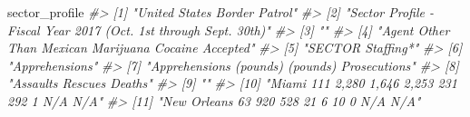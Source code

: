 \documentclass[
]{krantz}
\makeatletter
\newenvironment{Shaded}{\begin{snugshade}}{\end{snugshade}}
\newcommand{\CommentTok}[1]{\textcolor[rgb]{0.37,0.37,0.37}{\textit{#1}}}
\newcommand{\NormalTok}[1]{#1}
\newenvironment{kframe}{%
\medskip{}
\setlength{\fboxsep}{.8em}
 \def\at@end@of@kframe{}%
 \ifinner\ifhmode%
  \def\at@end@of@kframe{\end{minipage}}%
  \begin{minipage}{\columnwidth}%
 \fi\fi%
 \def\FrameCommand##1{\hskip\@totalleftmargin \hskip-\fboxsep
 \colorbox{shadecolor}{##1}\hskip-\fboxsep
     \hskip-\linewidth \hskip-\@totalleftmargin \hskip\columnwidth}%
 \MakeFramed {\advance\hsize-\width
   \@totalleftmargin\z@ \linewidth\hsize
   \@setminipage}}%
 {\par\unskip\endMakeFramed%
 \at@end@of@kframe}
\renewenvironment{Shaded}{\begin{kframe}}{\end{kframe}}
\makeatother
\begin{document}
\begin{Shaded}
\begin{Highlighting}[]
\NormalTok{sector\_profile}
\CommentTok{\#\textgreater{}  [1] "United States Border Patrol"                                                                                                                                                                               }
\CommentTok{\#\textgreater{}  [2] "Sector Profile {-} Fiscal Year 2017 (Oct. 1st through Sept. 30th)"                                                                                                                                           }
\CommentTok{\#\textgreater{}  [3] ""                                                                                                                                                                                                          }
\CommentTok{\#\textgreater{}  [4] "Agent                              Other Than Mexican            Marijuana          Cocaine         Accepted"                                                                                              }
\CommentTok{\#\textgreater{}  [5] "SECTOR                           Staffing*"                                                                                                                                                                }
\CommentTok{\#\textgreater{}  [6] "Apprehensions"                                                                                                                                                                                             }
\CommentTok{\#\textgreater{}  [7] "Apprehensions                 (pounds)          (pounds)     Prosecutions"                                                                                                                                 }
\CommentTok{\#\textgreater{}  [8] "Assaults Rescues                 Deaths"                                                                                                                                                                   }
\CommentTok{\#\textgreater{}  [9] ""                                                                                                                                                                                                          }
\CommentTok{\#\textgreater{} [10] "Miami                                             111              2,280                     1,646                  2,253              231               292              1              N/A      N/A"     }
\CommentTok{\#\textgreater{} [11] "New Orleans                                        63                920                      528                     21                 6               10               0              N/A      N/A"     }

\end{Highlighting}
\end{Shaded}
\end{document}
